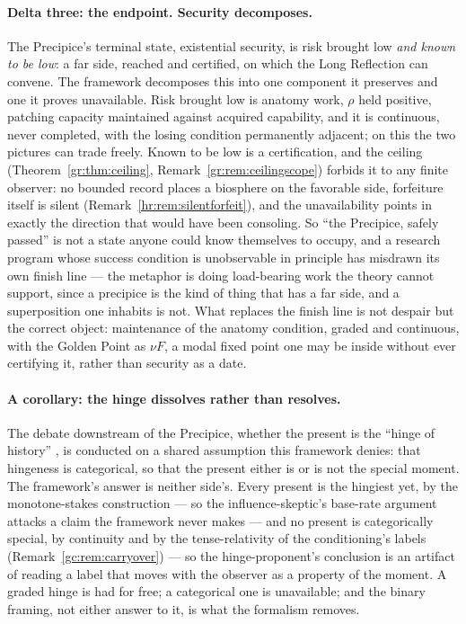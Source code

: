 \documentclass[11pt]{article}
\numberwithin{equation}{section}
\theoremstyle{plain}
\theoremstyle{definition}
\theoremstyle{remark}
\begin{document}
\paragraph{Delta three: the endpoint. Security decomposes.} The
Precipice's terminal state, existential security, is risk
brought low \emph{and known to be low}: a far side, reached and
certified, on which the Long Reflection can convene. The framework
decomposes this into one component it preserves and one it proves
unavailable. Risk brought low is anatomy work, $\rho$ held
positive, patching capacity maintained against acquired capability, and it is continuous, never completed, with the losing condition
permanently adjacent; on this the two pictures can trade freely.
Known to be low is a certification, and the ceiling
(Theorem~\ref{gr:thm:ceiling}, Remark~\ref{gr:rem:ceilingscope})
forbids it to any finite observer: no bounded record places a
biosphere on the favorable side, forfeiture itself is silent
(Remark~\ref{hr:rem:silentforfeit}), and the unavailability points in
exactly the direction that would have been consoling. So ``the
Precipice, safely passed'' is not a state anyone could know themselves
to occupy, and a research program whose success condition is
unobservable in principle has misdrawn its own finish line --- the
metaphor is doing load-bearing work the theory cannot support, since a
precipice is the kind of thing that has a far side, and a
superposition one inhabits is not. What replaces the finish line is
not despair but the correct object: maintenance of the anatomy
condition, graded and continuous, with the Golden Point as
$\nu F$, a modal fixed point one may be inside without ever
certifying it, rather than security as a date.

\paragraph{A corollary: the hinge dissolves rather than resolves.}
The debate downstream of the Precipice, whether the present is the
``hinge of history'' \cite{MacAskill22, GM21}, is conducted on a
shared assumption this framework denies: that hingeness is
categorical, so that the present either is or is not the special
moment. The framework's answer is neither side's. Every present is the
hingiest yet, by the monotone-stakes construction --- so the
influence-skeptic's base-rate argument attacks a claim the framework
never makes --- and no present is categorically special, by
continuity and by the tense-relativity of the conditioning's labels
(Remark~\ref{gc:rem:carryover}) --- so the hinge-proponent's
conclusion is an artifact of reading a label that moves with the
observer as a property of the moment. A graded hinge is had for free;
a categorical one is unavailable; and the binary framing, not either
answer to it, is what the formalism removes.
\end{document}
